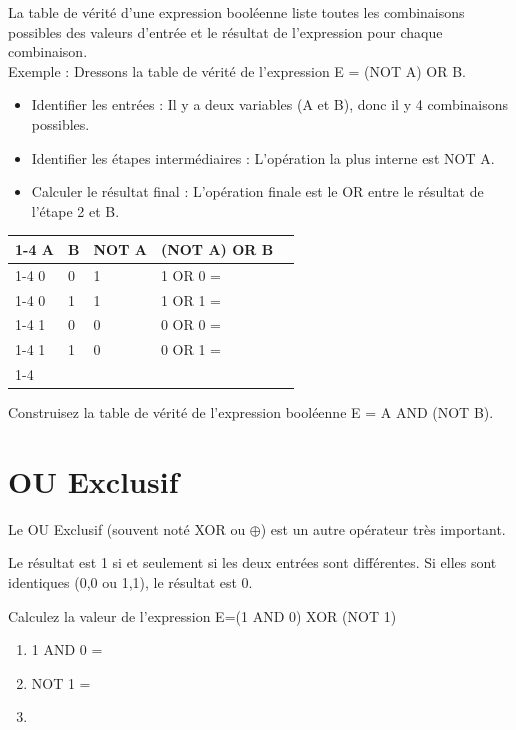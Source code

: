 La table de vérité d'une expression booléenne liste toutes les combinaisons possibles des valeurs d'entrée et le résultat de l'expression pour chaque combinaison.\\

Exemple : Dressons la table de vérité de l'expression E = (NOT A) OR B.\\
\begin{itemize}
    \item Identifier les entrées : Il y a deux variables (A et B), donc il y 4 combinaisons possibles.
    \item  Identifier les étapes intermédiaires : L'opération la plus interne est NOT A.
    \item Calculer le résultat final : L'opération finale est le OR entre le résultat de l'étape 2 et B.
\end{itemize}
\begin{center}
\begin{tabular}{|l|l|l|l|l}
\cline{1-4}
A & B & NOT A & (NOT A) OR B &  \\ \cline{1-4}
0 & 0 & 1     & 1 OR 0 =   &  \\ \cline{1-4}
0 & 1 & 1     & 1 OR 1 =    &  \\ \cline{1-4}
1 & 0 & 0     & 0 OR 0 =    &  \\ \cline{1-4}
1 & 1 & 0     & 0 OR 1 =    &  \\ \cline{1-4}
\end{tabular}
\end{center}

\begin{Avous}
    Construisez la table de vérité de l'expression booléenne E = A AND (NOT B).
    \vspace{3.5cm}
\end{Avous}

\section{OU Exclusif}

Le OU Exclusif (souvent noté XOR ou $\oplus$) est un autre opérateur très important.

Le résultat est 1 si et seulement si les deux entrées sont différentes. Si elles sont identiques (0,0 ou 1,1), le résultat est 0.

\begin{Avous}
    Calculez la valeur de l'expression E=(1 AND 0) XOR (NOT 1)
    \begin{enumerate}
        \item 1 AND 0 =
        \item NOT 1 = 
        \item 
    \end{enumerate}
    \vspace{3cm}
\end{Avous}

